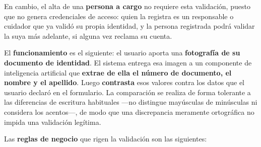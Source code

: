 \documentclass[a4paper,12pt]{article}
\begin{document}
    \par En cambio, el alta de una \textbf{persona a cargo} no requiere esta validación, puesto que no genera credenciales de acceso: quien la registra es un responsable o cuidador que ya validó su propia identidad, y la persona registrada podrá validar la suya más adelante, si alguna vez reclama su cuenta.
    \par El \textbf{funcionamiento} es el siguiente: el usuario aporta una \textbf{fotografía de su documento de identidad}. El sistema entrega esa imagen a un componente de inteligencia artificial que \textbf{extrae de ella el número de documento, el nombre y el apellido}. Luego \textbf{contrasta} esos valores contra los datos que el usuario declaró en el formulario. La comparación se realiza de forma tolerante a las diferencias de escritura habituales —no distingue mayúsculas de minúsculas ni considera los acentos—, de modo que una discrepancia meramente ortográfica no impida una validación legítima.
    \par Las \textbf{reglas de negocio} que rigen la validación son las siguientes:
\end{document}

